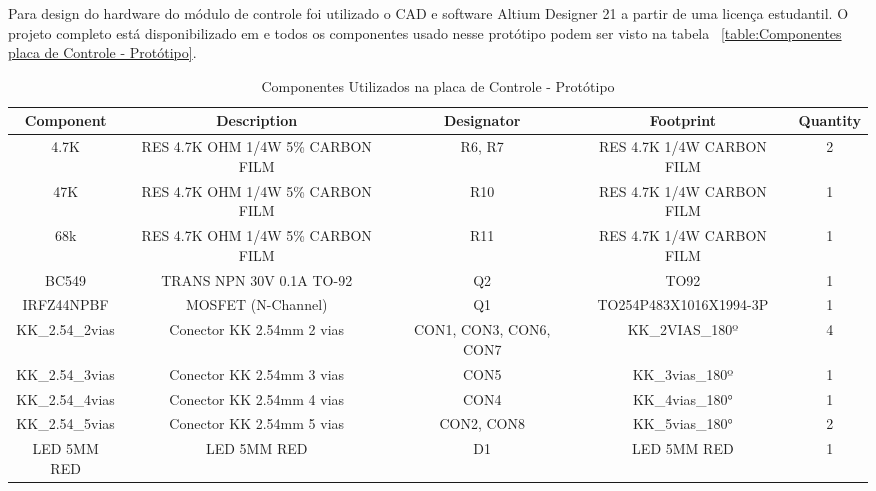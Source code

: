 \documentclass[../poliXuniversity_hospital_-USP-report.tex]{subfiles}
\begin{document}
Para design do hardware do módulo de controle foi utilizado o CAD e software Altium Designer 21 \cite{altium21} a partir de uma licença estudantil. O projeto completo está disponibilizado em \cite{github_modulos} e todos os componentes usado nesse protótipo podem ser visto na tabela ~\ref{table:Componentes placa de Controle - Protótipo}.

\begin{table}[!h]
\caption{Componentes Utilizados na placa de Controle - Protótipo}
\centering
\begin{adjustbox}{width=\columnwidth,center}
\begin{tabular}{|c|c|c|c|c|}
\hline
Component                   & Description                                  & Designator             & Footprint                 & Quantity \\ \hline
4.7K                      & RES 4.7K OHM 1/4W 5\% CARBON FILM            & R6, R7                 & RES 4.7K 1/4W CARBON FILM & 2        \\ \hline
47K                       & RES 4.7K OHM 1/4W 5\% CARBON FILM            & R10                    & RES 4.7K 1/4W CARBON FILM & 1        \\ \hline
68k                       & RES 4.7K OHM 1/4W 5\% CARBON FILM            & R11                    & RES 4.7K 1/4W CARBON FILM & 1        \\ \hline
BC549                     & TRANS NPN 30V 0.1A TO-92                     & Q2                     & TO92                      & 1        \\ \hline
IRFZ44NPBF                & MOSFET (N-Channel)                           & Q1                     & TO254P483X1016X1994-3P    & 1        \\ \hline
KK\_2.54\_2vias           & Conector KK 2.54mm 2 vias                    & CON1, CON3, CON6, CON7 & KK\_2VIAS\_180º           & 4        \\ \hline
KK\_2.54\_3vias           & Conector KK 2.54mm 3 vias                    & CON5                   & KK\_3vias\_180º           & 1        \\ \hline
KK\_2.54\_4vias           & Conector KK 2.54mm 4 vias                    & CON4                   & KK\_4vias\_180°           & 1        \\ \hline
KK\_2.54\_5vias           & Conector KK 2.54mm 5 vias                    & CON2, CON8             & KK\_5vias\_180°           & 2        \\ \hline
LED 5MM RED               & LED 5MM RED                                  & D1                     & LED 5MM RED               & 1        \\ \hline

\end{tabular}
\end{adjustbox}
\end{table}
\end{document}
